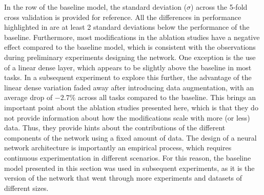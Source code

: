 In the row of the baseline model, the standard deviation
($\sigma$) across the 5-fold cross validation is provided
for reference. All the differences in performance
highlighted in  are at least 2 standard
deviations below the performance of the baseline.
Furthermore, most modifications in the ablation studies have
a negative effect compared to the baseline model, which is
consistent with the observations during preliminary
experiments designing the network. One exception is the use
of a linear dense layer, which appears to be slightly above
the baseline in most tasks. In a subsequent experiment to
explore this further, the advantage of the linear dense
variation faded away after introducing data augmentation,
with an average drop of $-2.7\%$ across all tasks compared
to the baseline. This brings an important point about the
ablation studies presented here, which is that they do not
provide information about how the modifications scale with
more (or less) data. Thus, they provide hints about the
contributions of the different components of the network
using a fixed amount of data. The design of a neural network
architecture is importantly an empirical process, which
requires continuous experimentation in different scenarios.
For this reason, the baseline model presented in this
section was used in subsequent experiments, as it is the
version of the network that went through more experiments
and datasets of different sizes.
